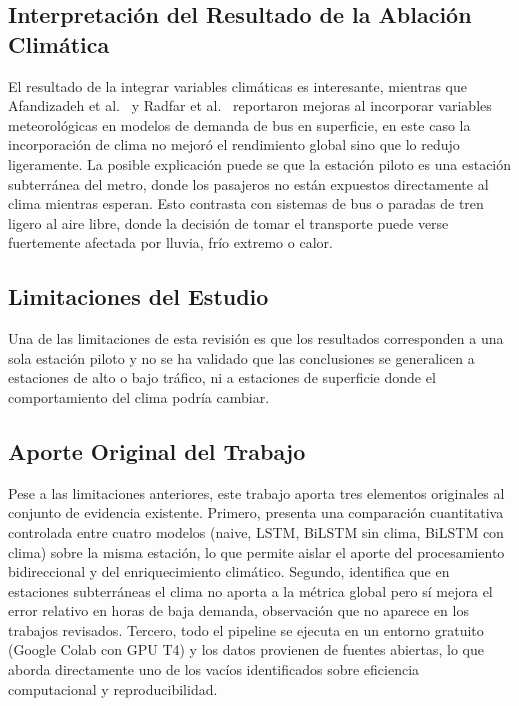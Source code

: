 \documentclass[preprint,12pt]{elsarticle}
\begin{document}
\subsection{Interpretación del Resultado de la Ablación Climática}

El resultado de la integrar variables climáticas es interesante, mientras que Afandizadeh et al.\ \cite{afandizadeh2024} y Radfar et al.\ \cite{radfar2025} reportaron mejoras al incorporar variables meteorológicas en modelos de demanda de bus en superficie, en este caso la incorporación de clima no mejoró el rendimiento global sino que lo redujo ligeramente. La posible explicación puede se que la estación piloto es una estación subterránea del metro, donde los pasajeros no están expuestos directamente al clima mientras esperan. Esto contrasta con sistemas de bus o paradas de tren ligero al aire libre, donde la decisión de tomar el transporte puede verse fuertemente afectada por lluvia, frío extremo o calor.

\subsection{Limitaciones del Estudio}

Una de las limitaciones de esta revisión es que los resultados corresponden a una sola estación piloto y no se ha validado que las conclusiones se generalicen a estaciones de alto o bajo tráfico, ni a estaciones de superficie donde el comportamiento del clima podría cambiar. 

\subsection{Aporte Original del Trabajo}

Pese a las limitaciones anteriores, este trabajo aporta tres elementos originales al conjunto de evidencia existente. Primero, presenta una comparación cuantitativa controlada entre cuatro modelos (naive, LSTM, BiLSTM sin clima, BiLSTM con clima) sobre la misma estación, lo que permite aislar el aporte del procesamiento bidireccional y del enriquecimiento climático. Segundo, identifica que en estaciones subterráneas el clima no aporta a la métrica global pero sí mejora el error relativo en horas de baja demanda, observación que no aparece en los trabajos revisados. Tercero, todo el pipeline se ejecuta en un entorno gratuito (Google Colab con GPU T4) y los datos provienen de fuentes abiertas, lo que aborda directamente uno de los vacíos identificados sobre eficiencia computacional y reproducibilidad.
\end{document}
